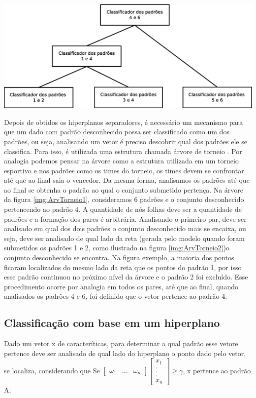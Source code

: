 \begin{center}
	\includegraphics[scale=0.4]{graficos/ArvTorneio2}
	\label{img:ArvTorneio2}
\end{center}
Depois de obtidos os hiperplanos separadores, é necessário um mecanismo para que um dado com padrão desconhecido possa ser classificado como um dos padrões, ou seja, analisando um vetor é preciso descobrir qual dos padrões ele se classifica. Para isso, é utilizada uma estrutura chamada árvore de torneio \cite{Feng} \cite{Guo}. Por analogia podemos pensar na árvore como a estrutura utilizada em um torneio esportivo e nos padrões como os times do torneio, os times devem se confrontar até que ao final saia o vencedor. Da mesma forma, analisamos os padrões até que ao final se obtenha o padrão ao qual o conjunto submetido pertença.
Na árvore da figura \ref{img:ArvTorneio1}, consideramos 6 padrões e o conjunto desconhecido pertencendo ao padrão 4. A quantidade de nós folhas deve ser a quantidade de padrões e a formação dos pares é arbitrária. Analisando o primeiro par, deve ser analisado em qual dos dois padrões o conjunto desconhecido mais se encaixa, ou seja, deve ser analisado de qual lado da reta (gerada pelo modelo quando foram submetidos os padrões 1 e 2, como ilustrado na figura \ref{img:ArvTorneio2})o conjunto desconhecido se encontra. Na figura exemplo, a maioria dos pontos ficaram localizados do mesmo lado da reta que os pontos do padrão 1, por isso esse padrão continuou no próximo nível da árvore e o padrão 2 foi excluído. Esse procedimento ocorre por analogia em todos os pares, até que ao final, quando analisados os padrões 4 e 6, foi definido que o vetor pertence ao padrão 4.

\subsection{Classificação com base em um hiperplano}
Dado um vetor x de caracteríticas, para determinar a qual padrão esse vetore pertence deve ser analisado de qual lado do hiperplano o ponto dado pelo vetor, se localiza, considerando que 
Se $ \begin{bmatrix}
\omega _{1} & ... & \omega _{n} 
\end{bmatrix}
\begin{bmatrix}
x_{1}
\\ 
.
\\
. 
\\
. 
\\
x_{n}
\end{bmatrix}
\geq \gamma $, x pertence ao padrão A;


